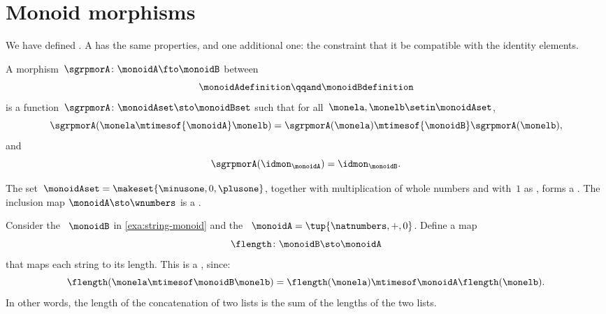 
\section{Monoid morphisms}
We have defined .
A  has the same properties, and one additional one: the constraint that it be compatible with the identity elements.

\begin{ctdefinition}
    \label{def:monoid-mor}
    A morphism~$\sgrpmorA\colon \monoidA \fto \monoidB$ between 
    \begin{equation}
        \monoidAdefinition
        \qqand
        \monoidBdefinition
    \end{equation}
    is a function~$\sgrpmorA \colon \monoidAset \sto \monoidBset$ such that for all~$\monela, \monelb\setin \monoidAset$,
    \begin{equation}
        \label{eq:mon-mor-comp}
        \sgrpmorA (\monela \mtimesof{\monoidA} \monelb) = \sgrpmorA (\monela) \mtimesof{\monoidB} \sgrpmorA(\monelb),
    \end{equation}
    and
    \begin{equation}
        \label{eq:mon-id-comp}
        \sgrpmorA (\idmon_\monoidA) = \idmon_{\monoidB}.
    \end{equation}
\end{ctdefinition}

\begin{example}
    The set~$\monoidAset = \makeset{ \minusone, 0, \plusone }$, together with multiplication of whole numbers and with~$1$ as , forms a .
    The inclusion map $\monoidA \sto \wnumbers$ is a .
\end{example}

\begin{example}
    \label{exa:string-length}
    Consider the ~$\monoidB$ in \cref{exa:string-monoid} and the ~$\monoidA=\tup{\natnumbers, +, 0}$.
    Define a map
    \begin{equation}
        \flength \colon \monoidB \sto \monoidA
    \end{equation}
    that maps each string to its length.
    This is a , since:
    \begin{equation}
        \flength(\monela \mtimesof\monoidB \monelb)=\flength(\monela)\mtimesof\monoidA \flength(\monelb).
    \end{equation}
    In other words, the length of the concatenation of two lists is the sum of the lengths of the two lists.
\end{example}

